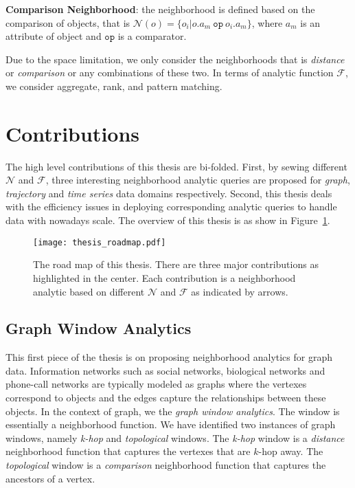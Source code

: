 \textbf{Comparison Neighborhood}: the neighborhood is defined based on the comparison of objects, that is $\mathcal{N}(o) = \{o_i | o.a_m \ \mathtt{op} \ o_i.a_m\}$, where $a_m$ is an attribute of object
and $\mathtt{op}$ is a comparator.

Due to the space limitation, we only consider the neighborhoods that is \emph{distance} or \emph{comparison} or any combinations of these two. In terms of analytic function $\mathcal{F}$, we consider aggregate, rank, and pattern matching.

\section{Contributions}
The high level contributions of this thesis are bi-folded. First, by
sewing different $\mathcal{N}$ and $\mathcal{F}$, three interesting
neighborhood analytic queries are proposed for \emph{graph}, \emph{trajectory}
and \emph{time series} data domains respectively. Second, this thesis
deals with the efficiency issues in deploying corresponding analytic queries to
handle data with nowadays scale.
The overview of this thesis is as show in Figure~\ref{fig:thesis_roadmap}.
\begin{figure}[h]
\centering
\texttt{[image: thesis\_roadmap.pdf]}
\caption{The road map of this thesis. There are three major contributions as highlighted in the center. Each contribution
is a neighborhood analytic based on different $\mathcal{N}$ and $\mathcal{F}$ as indicated by arrows.} 
\label{fig:thesis_roadmap}
\end{figure}

\subsection{Graph Window Analytics}
This first piece of the thesis is on proposing neighborhood analytics
for graph data. Information networks such as social networks, biological networks
and phone-call networks are typically modeled as graphs where the 
vertexes correspond to objects and the edges capture the
relationships between these objects. In the context of graph, we 
the \emph{graph window analytics}. The window is essentially 
a neighborhood function. We have identified 
two instances of graph windows, namely
\emph{k-hop} and \emph{topological} windows. 
The \emph{k-hop} window is a \emph{distance} neighborhood function that
captures the vertexes that are $k$-hop away. The \emph{topological}
window is a \emph{comparison} neighborhood function that captures
the ancestors of a vertex. 

